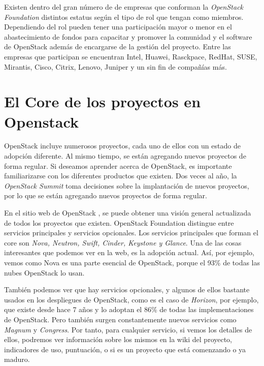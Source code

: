 Existen dentro del gran número de de empresas que conforman la \textit{OpenStack Foundation} distintos estatus según el tipo de rol que tengan como miembros. Dependiendo del rol pueden tener una participación mayor o menor en el abastecimiento de fondos para capacitar y promover la comunidad y el software de OpenStack además de encargarse de la gestión del proyecto. Entre las empresas que participan se encuentran Intel, Huawei, Rasckpace, RedHat, SUSE, Mirantis, Cisco, Citrix, Lenovo, Juniper y un sin fin de compañías más.\cite{noauthor_companies_nodate}


\section{El Core de los proyectos en Openstack}
OpenStack incluye numerosos proyectos, cada uno de ellos con un estado de adopción diferente. Al mismo tiempo, se están agregando nuevos proyectos de forma regular.
Si deseamos aprender acerca de OpenStack, es importante familiarizarse con los diferentes productos que existen. Dos veces al año, la \textit{OpenStack Summit} toma  decisiones sobre la implantación de nuevos proyectos, por lo que se están agregando nuevos proyectos de forma regular.

En el sitio web de OpenStack \cite{noauthor_open_nodate}, se puede obtener una visión general actualizada de todos los proyectos que existen. OpenStack Foundation distingue entre servicios principales y servicios opcionales. Los servicios principales que forman el core son \textit{Nova, Neutron, Swift, Cinder, Keystone y Glance}. Una de las cosas interesantes que podemos ver en la web, es la adopción actual. Así, por ejemplo, vemos como Nova es una parte esencial de OpenStack, porque el 93\% de todas las nubes OpenStack lo usan.


También podemos ver que hay servicios opcionales, y algunos de ellos bastante usados en los despliegues de OpenStack, como es el caso de \textit{Horizon}, por ejemplo, que existe desde hace 7 años y lo adoptan el 86\% de todas las implementaciones de OpenStack. Pero también surgen constantemente nuevos servicios como \textit{Magnum} y \textit{Congress}. Por tanto, para cualquier servicio, si vemos los detalles de ellos, podremos ver información sobre los mismos en la wiki del proyecto, indicadores de uso, puntuación, o si es un proyecto que está comenzando o ya maduro.

